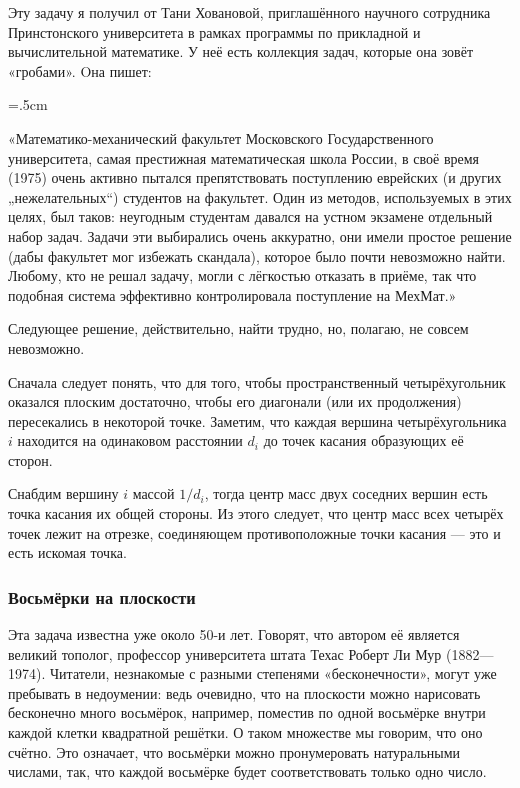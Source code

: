 Эту задачу я получил от Тани Ховановой, приглашённого научного сотрудника Принстонского университета в рамках программы по прикладной и вычислительной математике.
У неё есть коллекция задач, которые она зовёт «гробами».
Oна пишет:

\medskip

\begin{trivlist}\leftskip=1cm\rightskip=.5cm
\item\relax«Математико-механический факультет Московского Государственного университета, самая престижная математическая школа России, в своё время (1975) очень активно пытался препятствовать поступлению еврейских (и других „нежелательных“) студентов на факультет.
Один из методов, используемых в этих целях, был таков: неугодным студентам давался на устном экзамене отдельный набор задач.
Задачи эти выбирались очень аккуратно, они имели простое решение (дабы факультет мог избежать скандала), которое было почти невозможно найти.
Любому, кто не решал задачу, могли с лёгкостью отказать в приёме, так что подобная система эффективно контролировала поступление на МехМат.» 
\end{trivlist}

\medskip

Следующее решение, действительно, найти трудно, но, полагаю, не совсем невозможно.

\medskip

Сначала следует понять, что для того, чтобы пространственный четырёхугольник оказался плоским достаточно, чтобы его диагонали (или их продолжения) пересекались в некоторой точке.
Заметим, что каждая вершина четырёхугольника $i$ находится на одинаковом расстоянии $d_i$ до точек касания образующих её сторон.

Снабдим вершину $i$ массой $1/d_i$, тогда центр масс двух соседних вершин есть точка касания их общей стороны.
Из этого следует, что центр масс всех четырёх точек лежит на отрезке, соединяющем противоположные точки касания --- это и есть искомая точка.
\heart

\subsubsection*{Восьмёрки на плоскости}%

Эта задача известна уже около 50-и лет.
Говорят, что автором её является великий тополог, профессор университета штата Техас Роберт Ли Мур (1882---1974). %
Читатели, незнакомые с разными степенями «бесконечности», могут уже пребывать в недоумении: ведь очевидно, что на плоскости можно нарисовать бесконечно много восьмёрок, например, поместив по одной восьмёрке внутри каждой клетки квадратной решётки.
О таком множестве мы говорим, что оно счётно. 
Это означает, что восьмёрки можно пронумеровать натуральными числами, так, что каждой восьмёрке будет соответствовать только одно число.

